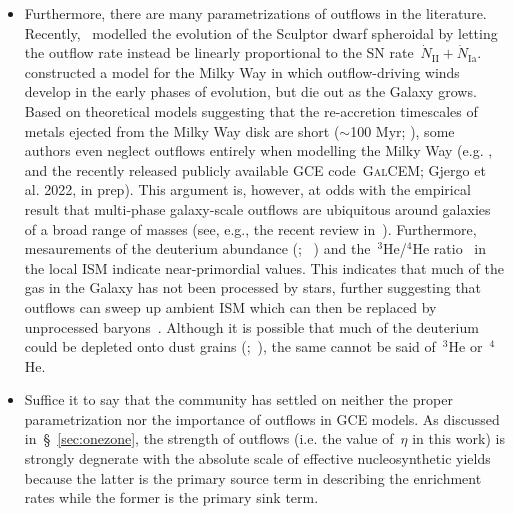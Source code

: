 \documentclass[ms.tex]{subfiles}
\begin{document}
\begin{itemize}
	\item Furthermore, there are many parametrizations of outflows in the
	literature. Recently,~\citet{delosReyes2022} modelled the evolution of the
	Sculptor dwarf spheroidal by letting the outflow rate instead be linearly
	proportional to the SN rate~$\dot{N}_\text{II} + \dot{N}_\text{Ia}$.
	\citet*{Kobayashi2020} constructed a model for the Milky Way in which
	outflow-driving winds develop in the early phases of evolution, but die
	out as the Galaxy grows.
	Based on theoretical models suggesting that the re-accretion timescales
	of metals ejected from the Milky Way disk are short ($\sim$100 Myr;
	\citealp{Melioli2008, Melioli2009, Spitoni2008, Spitoni2009}), some
	authors even neglect outflows entirely when modelling the Milky Way (e.g.
	\citealp{Spitoni2019, Spitoni2021}, and the recently released publicly
	available GCE code~\textsc{GalCEM}; Gjergo et al. 2022, in prep).
	This argument is, however, at odds with the empirical result that
	multi-phase galaxy-scale outflows are ubiquitous around galaxies of a broad
	range of masses (see, e.g., the recent review in~\citealp{Veilleux2020}).
	Furthermore, mesaurements of the deuterium abundance (\citealp{Linsky2006};
	~\citealp*{Prodanovic2010}) and the~$^3$He/$^4$He ratio~\citep{Balser2018}
	in the local ISM indicate near-primordial values.
	This indicates that much of the gas in the Galaxy has not been
	processed by stars, further suggesting that outflows can sweep up ambient
	ISM which can then be replaced by unprocessed baryons~\citep{Weinberg2017b,
	Cooke2022}.
	Although it is possible that much of the deuterium could be depleted
	onto dust grains (\citealp{Romano2006};~\citealp*{Steigman2007}), the
	same cannot be said of~$^3$He or~$^4$He.

	\item Suffice it to say that the community has settled on neither the
	proper parametrization nor the importance of outflows in GCE models.
	As discussed in~\S~\ref{sec:onezone},
	the strength of outflows (i.e. the value of~$\eta$ in this work) is
	strongly degnerate with the absolute scale of effective nucleosynthetic
	yields because the latter is the primary source term in describing the
	enrichment rates while the former is the primary sink term.


\end{itemize}
\end{document}
